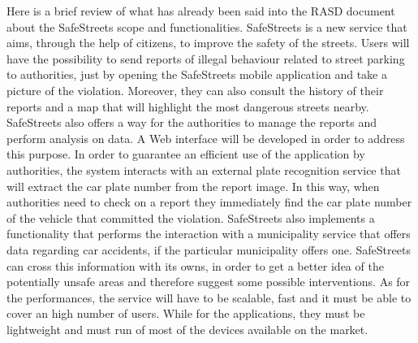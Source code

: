 Here is a brief review of what has already been said into the RASD document about the SafeStreets scope and functionalities.
\newline
SafeStreets is a new service that aims, through the help of citizens, to improve the safety of the streets. Users will have the possibility to send reports of illegal behaviour related to street parking to authorities, just by opening the SafeStreets mobile application and take a picture of the violation. Moreover, they can also consult the history of their reports and a map that will highlight the most dangerous streets nearby. SafeStreets also offers a way for the authorities to manage the reports and perform analysis on data. A Web interface will be developed in order to address this purpose. In order to guarantee an efficient use of the application by authorities, the system interacts with an external plate recognition service that will extract the car plate number from the report image. In this way, when authorities need to check on a report they immediately find the car plate number of the vehicle that committed the violation. SafeStreets also implements a functionality that performs the interaction with a municipality service that offers data regarding car accidents, if the particular municipality offers one. SafeStreets can cross this information with its owns, in order to get a better idea of the potentially unsafe areas and therefore suggest some possible interventions.
As for the performances, the service will have to be scalable, fast and it must be able to cover an high number of users. While for the applications, they must be lightweight and must run of most of the devices available on the market.
